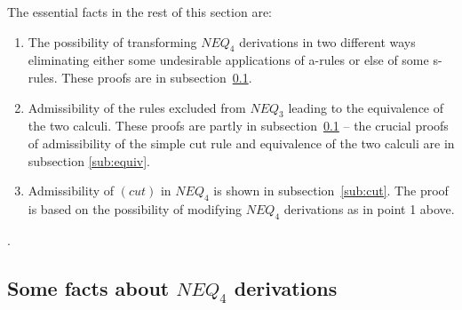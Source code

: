 
\noindent
The essential facts in the rest of this section are: 
\begin{enumerate}\MyLPar
\item The possibility of transforming $NEQ_{4}$ 
derivations in two different ways eliminating either some undesirable 
applications of a-rules or else of some s-rules. These proofs are in 
subsection~\ref{sub:der}. 
\item Admissibility of the rules 
excluded from $NEQ_{3}$ leading to the equivalence of the two 
calculi. These proofs are partly in subsection~\ref{sub:der} -- the 
crucial proofs of admissibility of the simple cut rule and
equivalence of the two calculi are in subsection \ref{sub:equiv}. 
\item Admissibility of $(cut)$ in $NEQ_{4}$ is 
shown in subsection~\ref{sub:cut}. The proof is based on the  
possibility of modifying $NEQ_{4}$ derivations as in point 1 above.
\end{enumerate}.

\subsection{Some facts about $NEQ_{4}$ derivations}\label{sub:der}

